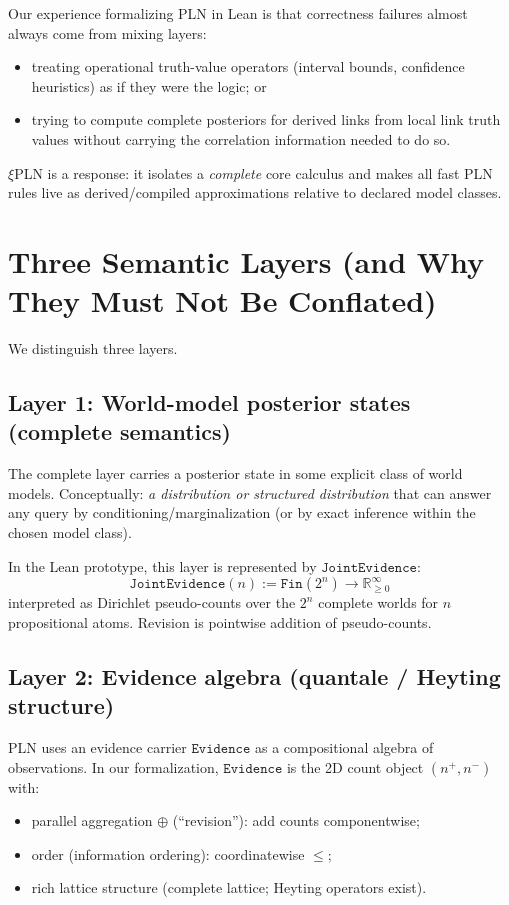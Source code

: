 \documentclass[]{article}
\newcommand{\xiPLN}{\texorpdfstring{$\xi$}{xi}\textup{PLN}}
\newcommand{\ty}[1]{\ensuremath{\mathtt{#1}}}
\newcommand{\Evidence}{\ty{Evidence}}
\newcommand{\JointEvidence}{\ty{JointEvidence}}
\newcommand{\hplus}{\ensuremath{\oplus}}
\begin{document}
Our experience formalizing PLN in Lean is that correctness failures almost always come from
mixing layers:
\begin{itemize}
\item treating operational truth-value operators (interval bounds, confidence heuristics) as if
  they were the logic; or
\item trying to compute complete posteriors for derived links from local link truth values
  without carrying the correlation information needed to do so.
\end{itemize}

\xiPLN{} is a response: it isolates a \emph{complete} core calculus and makes all fast PLN
rules live as derived/compiled approximations relative to declared model classes.

\section{Three Semantic Layers (and Why They Must Not Be Conflated)}

We distinguish three layers.

\subsection{Layer 1: World-model posterior states (complete semantics)}

The complete layer carries a posterior state in some explicit class of world models.
Conceptually: \emph{a distribution or structured distribution} that can answer any query by
conditioning/marginalization (or by exact inference within the chosen model class).

In the Lean prototype, this layer is represented by \JointEvidence{}:
\[
  \JointEvidence(n) := \texttt{Fin}(2^n) \to \mathbb{R}_{\ge 0}^{\infty}
\]
interpreted as Dirichlet pseudo-counts over the $2^n$ complete worlds for $n$ propositional
atoms.  Revision is pointwise addition of pseudo-counts.

\subsection{Layer 2: Evidence algebra (quantale / Heyting structure)}

PLN uses an evidence carrier \Evidence{} as a compositional algebra of observations.
In our formalization, \Evidence{} is the 2D count object $(n^+,n^-)$ with:
\begin{itemize}
\item parallel aggregation \hplus{} (``revision''): add counts componentwise;
\item order (information ordering): coordinatewise $\le$;
\item rich lattice structure (complete lattice; Heyting operators exist).
\end{itemize}
\end{document}
